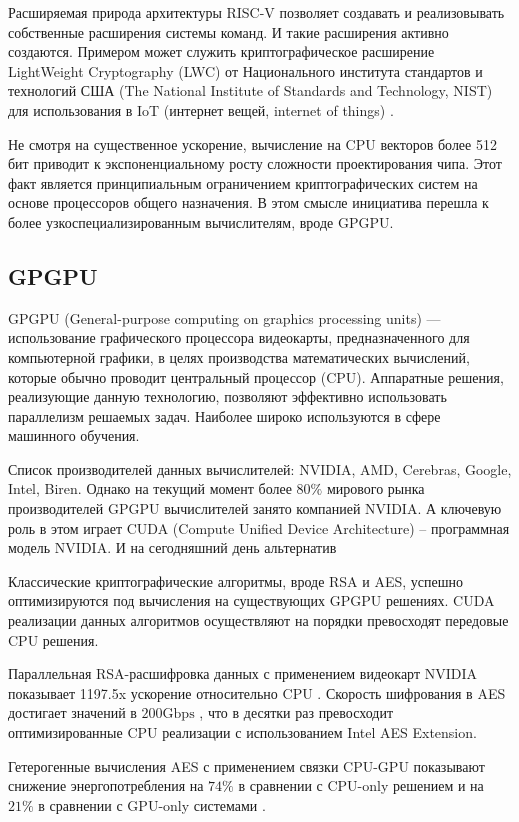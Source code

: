\documentclass[a4paper,12pt]{article}
\begin{document}
Расширяемая природа архитектуры RISC-V позволяет создавать и реализовывать собственные расширения системы команд.  И такие расширения активно создаются. Примером может служить криптографическое расширение LightWeight
Cryptography (LWC) от Национального института стандартов и технологий США (The National Institute of Standards and Technology, NIST) для использования в IoT (интернет вещей, internet of things) \cite{RISCV_IoT}.

Не смотря на существенное ускорение, вычисление на CPU векторов более 512 бит приводит к экспоненциальному росту сложности проектирования чипа. Этот факт является принципиальным ограничением криптографических систем на основе процессоров общего назначения. В этом смысле инициатива перешла к более узкоспециализированным вычислителям, вроде GPGPU.


\subsection{GPGPU}

GPGPU (General-purpose computing on graphics processing units) — использование графического процессора видеокарты, предназначенного для компьютерной графики, в целях производства математических вычислений, которые обычно проводит центральный процессор (CPU). Аппаратные решения, реализующие данную технологию, позволяют эффективно использовать параллелизм решаемых задач. Наиболее широко используются в сфере машинного обучения.

Список производителей данных вычислителей: NVIDIA, AMD, Cerebras, Google, Intel, Biren. Однако на текущий момент более $80\%$ мирового рынка производителей GPGPU вычислителей занято компанией NVIDIA. А ключевую роль в этом играет CUDA (Compute Unified Device Architecture) -- программная модель NVIDIA. И на сегодняшний день альтернатив

Классические криптографические алгоритмы, вроде RSA и AES, успешно оптимизируются под вычисления на существующих GPGPU решениях. CUDA реализации данных алгоритмов осуществляют на порядки превосходят передовые CPU решения.

Параллельная RSA-расшифровка данных с применением видеокарт NVIDIA показывает 1197.5x ускорение относительно CPU \cite{RSA_CUDA}. Скорость шифрования в AES достигает значений в $200 \text{Gbps}$ \cite{AES_CUDA} \cite{AES_Pascal}, что в десятки раз превосходит оптимизированные CPU реализации с использованием Intel AES Extension. 

Гетерогенные вычисления AES с применением связки CPU-GPU показывают снижение энергопотребления на $74\%$ в сравнении с CPU-only решением и на $21\%$ в сравнении с GPU-only системами \cite{GPGPU_EnergyEfficiency}.
\end{document}
